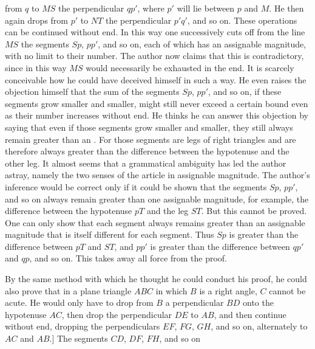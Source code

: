 from $q$ to $MS$ the perpendicular $qp'$, where $p'$ will lie between $p$ and $M$.
He then again drops from $p'$ to $NT$ the perpendicular $p'q'$, and so on.
These operations can be continued without end. In this way one successively cuts off from the
line $MS$ the segments $Sp$, $pp'$, and so on, each of which
has an assignable magnitude, with no limit to their number. The author now claims
that this is contradictory, since in this way $MS$ would necessarily be
exhausted in the end. It is scarcely conceivable how he could have deceived himself in such a
way. He even raises the objection himself that the
sum of the segments $Sp$, $pp'$, and so on, if these segments grow smaller and
smaller, might still never exceed
a certain bound even as their number increases without end. He thinks he can answer this objection by
saying that even if those segments grow smaller and smaller, they still
  always remain greater than an . For those segments
are legs of right triangles and are therefore always greater than the
difference between the hypotenuse and the other leg. It almost seems that
a grammatical ambiguity has led the author astray, namely the
  two senses of the article in  assignable magnitude. The author's inference
would be correct only if it could be shown that the segments $Sp$,
  $pp'$, and so on always remain greater than one  assignable
  magnitude, for example, the difference between the hypotenuse $pT$ and the leg
$ST$. But this cannot be proved. One can only show that each segment always remains
greater than an assignable magnitude that is itself different for each
segment. Thus $Sp$ is greater than the difference between $pT$ and $ST$,
and $pp'$ is greater than the difference between $qp'$ and $qp$, and so on.
This takes away all force from the proof.

\begin{center}\end{center}

By the same method with which he thought he could conduct his proof, he could
also prove that in a plane triangle $ABC$ in which $B$ is a right angle,
$C$ cannot be acute. He would only have to drop from $B$ a perpendicular $BD$ onto
the hypotenuse $AC$, then drop the perpendicular $DE$ to $AB$, and then
continue without end, dropping the perpendiculars $EF$, $FG$, $GH$, and so on, alternately to $AC$
and $AB$.] The segments $CD$, $DF$, $FH$, and so on
